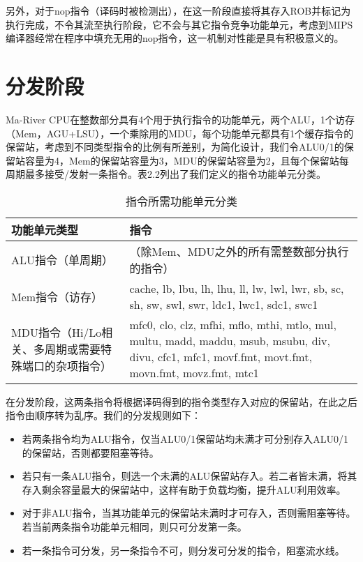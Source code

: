 另外，对于nop指令（译码时被检测出），在这一阶段直接将其存入ROB并标记为执行完成，不令其流至执行阶段，它不会与其它指令竞争功能单元，考虑到MIPS编译器经常在程序中填充无用的nop指令，这一机制对性能是具有积极意义的。

\section{分发阶段}

Ma-River CPU在整数部分具有4个用于执行指令的功能单元，两个ALU，1个访存（Mem，AGU+LSU），一个乘除用的MDU，每个功能单元都具有1个缓存指令的保留站，考虑到不同类型指令的比例有所差别，为简化设计，我们令ALU0/1的保留站容量为4，Mem的保留站容量为3，MDU的保留站容量为2，且每个保留站每周期最多接受/发射一条指令。表2.2列出了我们定义的指令功能单元分类。

\begin{table}[htb]
\centering
\caption{指令所需功能单元分类}
\label{fig:enter-label}
\begin{tabular}{m{3.5cm}<{\centering}|m{7cm}<{\centering}}
\hline  %
\textbf{功能单元类型} & \textbf{指令}\\
\hline
ALU指令（单周期） & （除Mem、MDU之外的所有需整数部分执行的指令） \\
\hline
Mem指令（访存） & cache, lb, lbu, lh, lhu, ll, lw, lwl, lwr, sb, sc, sh, sw, swl, swr, ldc1, lwc1, sdc1, swc1 \\
\hline
MDU指令（Hi/Lo相关、多周期或需要特殊端口的杂项指令） & mfc0, clo, clz, mfhi, mflo, mthi, mtlo, mul, multu, madd, maddu, msub, msubu, div, divu, cfc1, mfc1, movf.fmt, movt.fmt, movn.fmt, movz.fmt, mtc1 \\
\hline
\end{tabular}

\end{table}

在分发阶段，这两条指令将根据译码得到的指令类型存入对应的保留站，在此之后指令由顺序转为乱序。我们的分发规则如下：

\begin{itemize}
    \item 若两条指令均为ALU指令，仅当ALU0/1保留站均未满才可分别存入ALU0/1的保留站，否则都要阻塞等待。
    \item 若只有一条ALU指令，则选一个未满的ALU保留站存入。若二者皆未满，将其存入剩余容量最大的保留站中，这样有助于负载均衡，提升ALU利用效率。
    \item 对于非ALU指令，当其功能单元的保留站未满时才可存入，否则需阻塞等待。若当前两条指令功能单元相同，则只可分发第一条。
    \item 若一条指令可分发，另一条指令不可，则分发可分发的指令，阻塞流水线。
\end{itemize}

